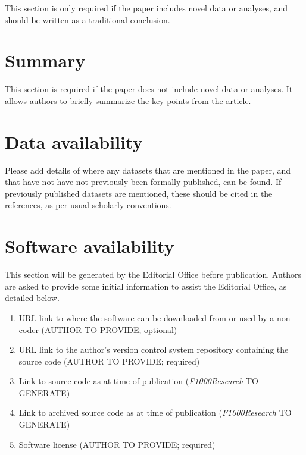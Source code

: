 \documentclass[9pt,a4paper,]{extarticle}
\begin{document}
This section is only required if the paper includes novel data or analyses, and should be written as a traditional conclusion.

\hypertarget{summary}{%
\section{\texorpdfstring{Summary }{Summary }}\label{summary}}

This section is required if the paper does not include novel data or analyses. It allows authors to briefly summarize the key points from the article.

\hypertarget{data-availability}{%
\section{\texorpdfstring{Data availability }{Data availability }}\label{data-availability}}

Please add details of where any datasets that are mentioned in the paper, and that have not have not previously been formally published, can be found. If previously published datasets are mentioned, these should be cited in the references, as per usual scholarly conventions.

\hypertarget{software-availability}{%
\section{Software availability}\label{software-availability}}

This section will be generated by the Editorial Office before publication. Authors are asked to provide some initial information to assist the Editorial Office, as detailed below.

\begin{enumerate}
\def\labelenumi{\arabic{enumi}.}
\tightlist
\item
  URL link to where the software can be downloaded from or used by a non-coder (AUTHOR TO PROVIDE; optional)
\item
  URL link to the author's version control system repository containing the source code (AUTHOR TO PROVIDE; required)
\item
  Link to source code as at time of publication (\emph{F1000Research} TO GENERATE)
\item
  Link to archived source code as at time of publication (\emph{F1000Research} TO GENERATE)
\item
  Software license (AUTHOR TO PROVIDE; required)
\end{enumerate}
\end{document}
